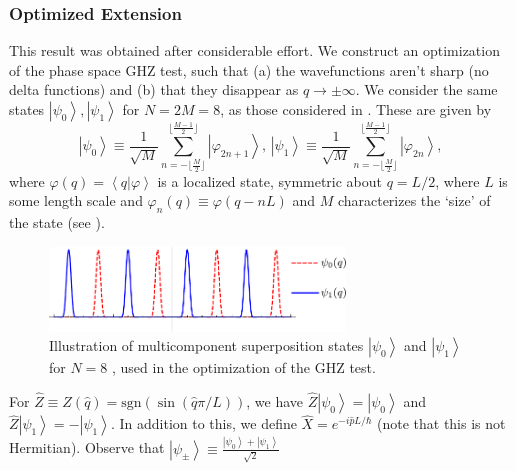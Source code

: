 \subsubsection{Optimized Extension \label{sub:Optimized-Extension}}

This result was obtained after considerable effort. We construct an
optimization of the phase space GHZ test, such that (a) the wavefunctions
aren't sharp (no delta functions) and (b) that they disappear as $q\to\pm\infty$.
We consider the same states $\left|\psi_{0}\right\rangle ,\left|\psi_{1}\right\rangle $
for $N=2M=8$, as those considered in \cite{BellMacroscopic}. These
are given by 
\[
\left|\psi_{0}\right\rangle \equiv\frac{1}{\sqrt{M}}\sum_{n=-\lfloor\frac{M}{2}\rfloor}^{\lfloor\frac{M-1}{2}\rfloor}\left|\varphi_{2n+1}\right\rangle ,\,\left|\psi_{1}\right\rangle \equiv\frac{1}{\sqrt{M}}\sum_{n=-\lfloor\frac{M}{2}\rfloor}^{\lfloor\frac{M-1}{2}\rfloor}\left|\varphi_{2n}\right\rangle ,
\]
where $\varphi(q)=\left\langle q|\varphi\right\rangle $ is a localized
state, symmetric about $q=L/2$, where $L$ is some length scale and
$\varphi_{n}(q)\equiv\varphi(q-nL)$ and $M$ characterizes the `size'
of the state (see ).
\begin{figure}
\begin{centering}
\includegraphics[width=0.7\textwidth]{Chapter2/Figs/Vector/ghzOpt}
\par\end{centering}

\caption{Illustration of multicomponent superposition states $\left|\psi_{0}\right\rangle $
and $\left|\psi_{1}\right\rangle $ for $N=8$ \cite{BellMacroscopic},
used in the optimization of the GHZ test.\label{fig:Illustration-of-multicomponent}}


%
%
\end{figure}
For $\hat{Z}\equiv Z(\hat{q})=\text{sgn}(\sin(\hat{q}\pi/L))$, we
have $\hat{Z}\left|\psi_{0}\right\rangle =\left|\psi_{0}\right\rangle $
and $\hat{Z}\left|\psi_{1}\right\rangle =-\left|\psi_{1}\right\rangle $.
In addition to this, we define $\hat{X}=e^{-i\hat{p}L/\hbar}$ (note
that this is not Hermitian). Observe that $\left|\psi_{\pm}\right\rangle \equiv\frac{\left|\psi_{0}\right\rangle +\left|\psi_{1}\right\rangle }{\sqrt{2}}$
